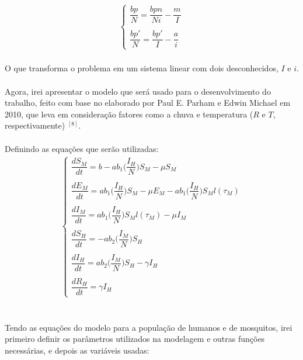 \documentclass[12pt]{article}
\begin{document}
\begin{gather*}
\begin{cases}
\dfrac{bp}{N} = \dfrac{bpn}{Ni} -\dfrac{m}{I} \\
\\
\dfrac{bp'}{N} = \dfrac{bp'}{I} -\dfrac{a}{i} 
\end{cases}
\end{gather*}
\\
O que transforma o problema em um sistema linear com dois desconhecidos, $I$ e $i$.
\\\\
Agora, irei apresentar o modelo que será usado para o desenvolvimento do trabalho, feito com base no elaborado por Paul E. Parham e Edwin Michael em 2010, que leva em consideração fatores como a chuva e temperatura ($R$ e $T$, respectivamente) $^{[8]}$. 
\\\\
Definindo as equações que serão utilizadas:
\begin{gather*}
\begin{cases}
\dfrac{dS_M}{dt} = b - ab_1\bigg(\dfrac{I_H}{N}\bigg)S_M - \mu S_M\\
\\
\dfrac{dE_M}{dt} = ab_1\bigg(\dfrac{I_H}{N}\bigg)S_M - \mu E_M - ab_1\bigg(\dfrac{I_H}{N}\bigg)S_Ml(\tau_M)\\
\\
\dfrac{dI_M}{dt} = ab_1\bigg(\dfrac{I_H}{N}\bigg)S_Ml(\tau_M) -\mu I_M\\
\\
\dfrac{dS_H}{dt} = -ab_2\bigg(\dfrac{I_M}{N}\bigg)S_H\\
\\
\dfrac{dI_H}{dt} = ab_2\bigg(\dfrac{I_M}{N}\bigg)S_H-\gamma I_H\\
\\
\dfrac{dR_H}{dt} = \gamma I_H
\end{cases}
\end{gather*}
\\\\
Tendo as equações do modelo para a população de humanos e de mosquitos, irei primeiro definir os parâmetros utilizados na modelagem e outras funções necessárias, e depois as variáveis usadas:
\end{document}
